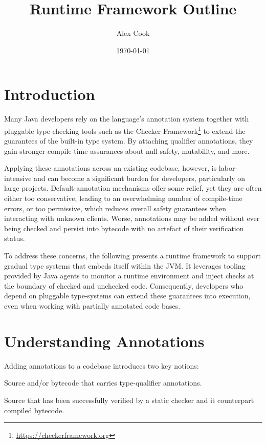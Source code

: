 \documentclass[12pt]{article}
\title{Runtime Framework Outline}
\author{Alex Cook}
\date{\today}
\begin{document}
\maketitle
\section{Introduction}\label{sec:intro}
Many Java developers rely on the language's annotation system together with pluggable type-checking tools such as the Checker Framework\footnote{\url{https://checkerframework.org}} to extend the guarantees of the built-in type system. By attaching qualifier annotations, they gain stronger compile-time assurances about null safety, mutability, and more.

Applying these annotations across an existing codebase, however, is labor-intensive and can become a significant burden for developers, particularly on large projects. Default-annotation mechanisms offer some relief, yet they are often either too conservative, leading to an overwhelming number of compile-time errors, or too permissive, which reduces overall safety guarantees when interacting with unknown clients. Worse, annotations may be added without ever being checked and persist into bytecode with no artefact of their verification status. 

To address these concerns, the following presents a runtime framework to support gradual type systems that embeds itself within the JVM. It leverages tooling provided by Java agents to monitor a runtime environment and inject checks at the boundary of checked and unchecked code. Consequently, developers who depend on pluggable type-systems can extend these guarantees into execution, even when working with partially annotated code bases.

\section{Understanding Annotations}\label{sec:annotations}
Adding annotations to a codebase introduces two key notions:

\begin{description}[style=nextline,leftmargin=1.6cm]
  \item[Marked code]
    Source and/or bytecode that carries type-qualifier annotations.
  \item[Checked code]
    Source that has been successfully verified by a static checker and it counterpart compiled bytecode.
\end{description}
\end{document}
